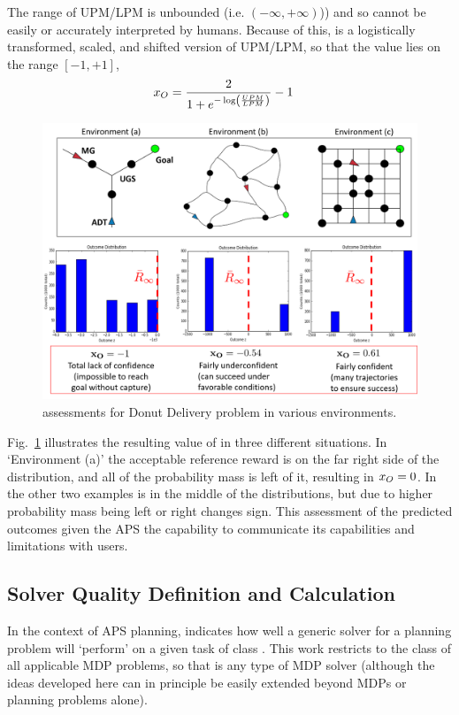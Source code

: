 The range of UPM/LPM is unbounded (i.e. $(-\infty,+\infty)$)) and so cannot be easily or accurately interpreted by humans. Because of this, \xO{} is a logistically transformed, scaled, and shifted version of UPM/LPM, so that the value lies on the range $[-1,+1]$, 
    \begin{align}
        \xO &= \frac{2}{1+e^{-\log\left(\frac{UPM}{LPM}\right)}}-1 \label{eq:xO}
    \end{align}
    \begin{figure}[tbp]
        \centering
        \includegraphics[width=0.95\linewidth]{Figures/xO_EnvsRewardsOnly.png}
        \caption{\xO{} assessments for Donut Delivery problem in various environments. }
        \label{fig:xOexample}
        \vspace{-0.5 cm}
    \end{figure}
\noindent Fig.~\ref{fig:xOexample} illustrates the resulting value of \xO{} in three different situations. In `Environment (a)' the acceptable reference reward \ris{} is on the far right side of the distribution, and all of the probability mass is left of it, resulting in $x_O=0$. In the other two examples \ris{} is in the middle of the distributions, but due to higher probability mass being left or right \xO{} changes sign. This assessment of the predicted outcomes given the APS the capability to communicate its capabilities and limitations with users.

\subsection{Solver Quality Definition and Calculation} \label{sec:xQ}
In the context of APS planning, \xQ{} indicates how well a generic solver \solve{} for a planning problem will `perform' on a given task \task{} of class \taskclass{}. This work restricts \taskclass{} to the class of all applicable MDP problems, so that \solve{} is any type of MDP solver  (although the ideas developed here can in principle be easily extended beyond MDPs or planning problems alone).

